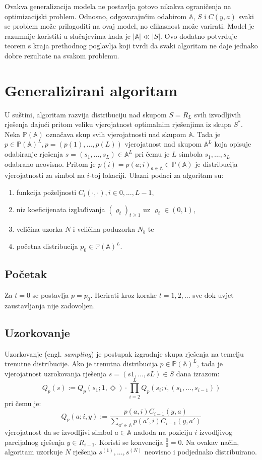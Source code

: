 \documentclass[times, utf8, zavrsni]{fer}
\begin{document}
Ovakva generalizacija modela ne postavlja gotovo nikakva ograničenja na optimizacijski problem. Odnosno, odgovarajućim odabirom
$\mathbb{A}$, $S$ i $C(y, a)$ svaki se problem može prilagoditi na ovaj model, no efikasnost može varirati. Model je razumnije koristiti u slučajevima kada je $|\mathbb{A}| \ll |S|$. Ovo dodatno potvrđuje teorem s kraja prethodnog poglavlja koji tvrdi da svaki algoritam ne daje jednako dobre rezultate na svakom problemu.



\section{Generalizirani algoritam}
U suštini, algoritam razvija distribuciju nad skupom $S=R_L$ svih izvodljivih rješenja dajući pritom veliku vjerojatnost optimalnim rješenjima iz skupa $S^*$.
Neka $\mathbb{P}(\mathbb{A})$ označava skup svih vjerojatnosti nad skupom $\mathbb{A}$. Tada je $p \in \mathbb{P}(\mathbb{A})^L, p = (p(1), . . . , p(L))$ vjerojatnost nad skupom $\mathbb{A}^L$ koja opisuje odabiranje rješenja
$s = (s_1,...,s_L) \in \mathbb{A}^L$ pri čemu je $L$ simbola $s_1,...,s_L$ odabrano neovisno. Pritom je
$p(i) = p(a;i)_{a \in \mathbb{A}} \in \mathbb{P}(\mathbb{A})$ je distribucija vjerojatnosti za simbol na $i$-toj lokaciji.
Ulazni podaci za algoritam su:
\begin{enumerate}
  \item funkcija poželjnosti $C_i(\cdot, \cdot), i \in {0,..., L-1}$,
  \item niz koeficijenata izglađivanja $(\varrho_t)_{t \geq 1}$ uz $\varrho_t \in (0, 1)$,
  \item veličina uzorka $N$ i veličina poduzorka $N_b$ te
  \item početna distribucija $p_0 \in \mathbb{P}(\mathbb{A})^L$.
\end{enumerate}

\subsection{Početak}
Za $t = 0$ se postavlja $p = p_0$. Iterirati kroz korake $t = 1, 2,...$ sve dok uvjet zaustavljanja nije zadovoljen.

\subsection{Uzorkovanje}
Uzorkovanje (engl. \textit{sampling}) je postupak izgradnje skupa rješenja na temelju trenutne distribucije.
Ako je trenutna distribucija $p \in \mathbb{P}(\mathbb{A})^L$, tada je vjerojatnost uzrokovanja rješenja $s = (s1,...,sL) \in S$ dana izrazom:
$$
Q_p(s) := Q_p(s_1; 1, \Diamond) \cdot \prod^L_{i=2} Q_p(s_i;i, (s_1,...,s_{i-1}))
$$
pri čemu je:
$$
Q_p(a;i, y) := \frac{p(a, i)C_{i-1}(y, a)}{\sum_{a' \in \mathbb{A}} p(a', i)C_{i-1}(y, a') }
$$
vjerojatnost da se izvodljivi simbol $a \in \mathbb{A}$ nadoda na poziciju $i$ izvodljivog parcijalnog rješenja $y \in R_{i-1}$. Koristi se konvencija $\frac{0}{0} = 0$.
Na ovakav način, algoritam uzorkuje $N$ rješenja $s^{(1)},...,s^{(N)}$ neovisno i podjednako distribuirano.
\end{document}
